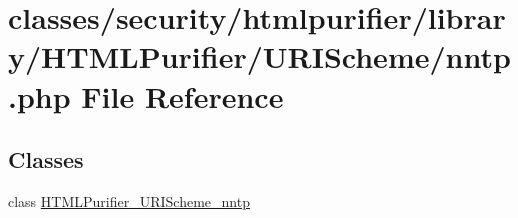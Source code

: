\hypertarget{nntp_8php}{\section{classes/security/htmlpurifier/library/\+H\+T\+M\+L\+Purifier/\+U\+R\+I\+Scheme/nntp.php File Reference}
\label{nntp_8php}
}
\subsection*{Classes}
\begin{DoxyCompactItemize}
\item 
class \hyperlink{classHTMLPurifier__URIScheme__nntp}{H\+T\+M\+L\+Purifier\+\_\+\+U\+R\+I\+Scheme\+\_\+nntp}
\end{DoxyCompactItemize}
